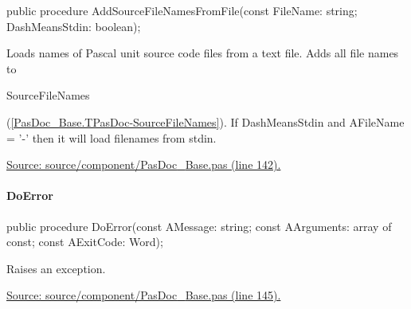 \documentclass{report}
\newif\ifpdf
\begin{document}
\label{PasDoc_Base.TPasDoc-AddSourceFileNamesFromFile}
\begin{list}{}{
\setlength{\itemindent}{0cm}
\setlength{\listparindent}{0cm}
\setlength{\leftmargin}{\evensidemargin}
\addtolength{\leftmargin}{\tmplength}
\settowidth{\labelsep}{X}
\addtolength{\leftmargin}{\labelsep}
\setlength{\labelwidth}{\tmplength}
}
\item[\textbf{Declaration}\hfill]
\ifpdf
\begin{flushleft}
\fi
\begin{ttfamily}
public procedure AddSourceFileNamesFromFile(const FileName: string; DashMeansStdin: boolean);\end{ttfamily}

\ifpdf
\end{flushleft}
\fi

\par
\item[\textbf{Description}]
Loads names of Pascal unit source code files from a text file. Adds all file names to \begin{ttfamily}SourceFileNames\end{ttfamily}(\ref{PasDoc_Base.TPasDoc-SourceFileNames}). If DashMeansStdin and AFileName = '{-}' then it will load filenames from stdin.\par
\href{https://github.com/pasdoc/pasdoc/blob/master/source/component/PasDoc_Base.pas#L142}{Source: source/component/PasDoc{\_}Base.pas (line 142).}

\end{list}
\paragraph*{DoError}\hspace*{\fill}

\label{PasDoc_Base.TPasDoc-DoError}
\begin{list}{}{
\setlength{\itemindent}{0cm}
\setlength{\listparindent}{0cm}
\setlength{\leftmargin}{\evensidemargin}
\addtolength{\leftmargin}{\tmplength}
\settowidth{\labelsep}{X}
\addtolength{\leftmargin}{\labelsep}
\setlength{\labelwidth}{\tmplength}
}
\item[\textbf{Declaration}\hfill]
\ifpdf
\begin{flushleft}
\fi
\begin{ttfamily}
public procedure DoError(const AMessage: string; const AArguments: array of const; const AExitCode: Word);\end{ttfamily}

\ifpdf
\end{flushleft}
\fi

\par
\item[\textbf{Description}]
Raises an exception.\par
\href{https://github.com/pasdoc/pasdoc/blob/master/source/component/PasDoc_Base.pas#L145}{Source: source/component/PasDoc{\_}Base.pas (line 145).}

\end{list}
\end{document}
